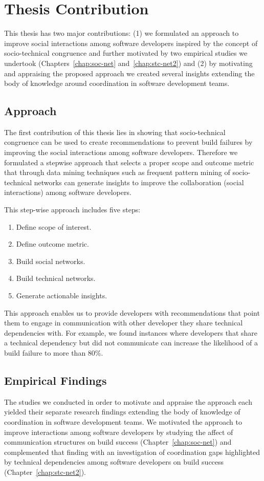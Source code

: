 \section{Thesis Contribution}
This thesis has two major contributions: (1) we formulated an approach to improve social interactions among software developers inspired by the concept of socio-technical congruence and further motivated by two empirical studies we undertook (Chapters~\ref{chap:soc-net} and~\ref{chap:stc-net2}) and (2) by motivating and appraising the proposed approach we created several insights extending the body of knowledge around coordination in software development teams.

\subsection{Approach}
The first contribution of this thesis lies in showing that socio-technical congruence can be used to create recommendations to prevent build failures by improving the social interactions among software developers.
Therefore we formulated a stepwise approach that selects a proper scope and outcome metric that through data mining techniques such as frequent pattern mining of socio-technical networks can generate insights to improve the collaboration (social interactions) among software developers.

This step-wise approach includes five steps:
\begin{enumerate}
\item Define scope of interest.
\item Define outcome metric.
\item Build social networks.
\item Build technical networks.
\item Generate actionable insights.
\end{enumerate}

This approach enables us to provide developers with recommendations that point them to engage in communication with other developer they share technical dependencies with.
For example, we found instances where developers that share a technical dependency but did not communicate can increase the likelihood of a build failure to more than 80\%.


\subsection{Empirical Findings}
The studies we conducted in order to motivate and appraise the approach each yielded their separate research findings extending the body of knowledge of coordination in software development teams.
We motivated the approach to improve interactions among software developers by studying the affect of communication structures on build success (Chapter~\ref{chap:soc-net}) and complemented that finding with an investigation of coordination gaps highlighted by technical dependencies among software developers on build success (Chapter~\ref{chap:stc-net2}).

